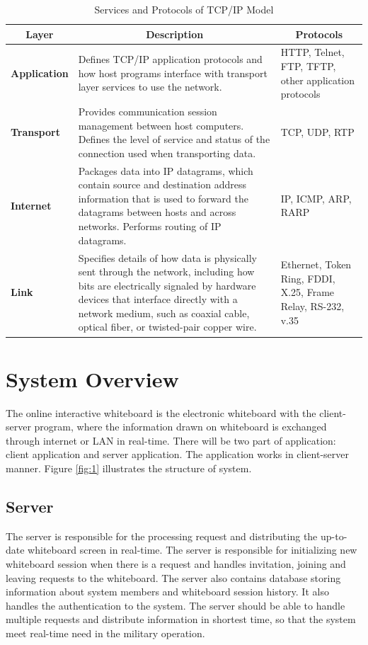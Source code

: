 \documentclass[conference]{IEEEtran}
\begin{document}
\begin{table}[h]
  \renewcommand{\arraystretch}{2}
  \renewcommand{\tabcolsep}{2mm}
 
  \begin{tabularx}{0.5\textwidth}{|p{1.5cm}|p{4.3cm}|p{2cm}|}
    \hline
    \multicolumn{1}{|c|}{\textbf{Layer}} &  
    \multicolumn{1}{c|}{\textbf{Description}} &
    \multicolumn{1}{c|}{\textbf{Protocols}} \\ \hline
    \textbf{Application} &  Defines TCP/IP application protocols and how host programs interface with transport layer services to use the network. & HTTP, Telnet, FTP, TFTP, other application protocols \\ \hline 
    \textbf{Transport} &  Provides communication session management between host computers. Defines the level of service and status of the connection used when transporting data. & TCP, UDP, RTP \\ \hline 
     \textbf{Internet} &  Packages data into IP datagrams, which contain source and destination address information that is used to forward the datagrams between hosts and across networks. Performs routing of IP datagrams. & IP, ICMP, ARP, RARP \\ \hline 
     \textbf{Link} &  Specifies details of how data is physically sent through the network, including how bits are electrically signaled by hardware devices that interface directly with a network medium, such as coaxial cable, optical fiber, or twisted-pair copper wire. & Ethernet, Token Ring, FDDI, X.25, Frame Relay, RS-232, v.35 \\ \hline 
  \end{tabularx}
  \space
  \caption{Services and Protocols of TCP/IP Model}
  \label{tab:1}
\end{table}
\section{System Overview}
The online interactive whiteboard is the electronic whiteboard with the client-server program, where the information drawn on whiteboard is exchanged through internet or LAN in real-time. There will be two part of application: client application and server application. The application works in client-server manner.  Figure \ref{fig:1} illustrates the structure of system.  
\subsection{Server}
The server is responsible for the processing request and distributing the up-to-date whiteboard screen in real-time. The server is responsible for initializing new whiteboard session when there is a request and handles invitation, joining and leaving requests to the whiteboard. The server also contains database storing information about system members and whiteboard session history. It also handles the authentication to the system. The server should be able to handle multiple requests and distribute information in shortest time, so that the system meet real-time need in the military operation.
\end{document}
